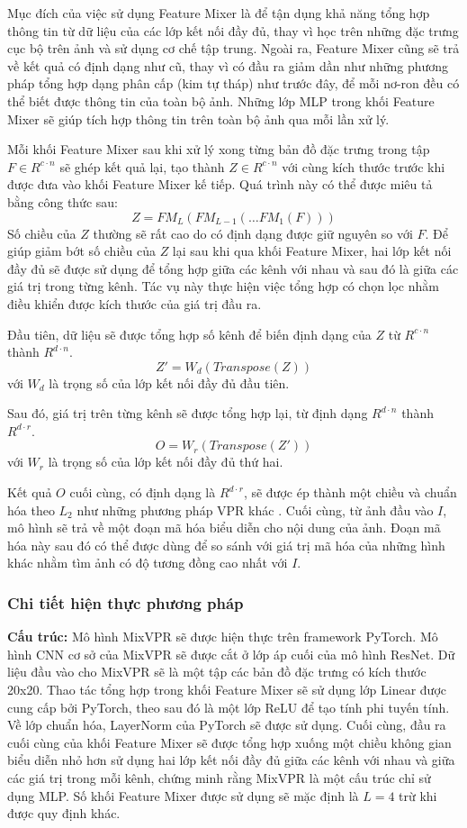 Mục đích của việc sử dụng Feature Mixer là để tận dụng khả năng tổng hợp thông tin từ dữ liệu của các lớp kết nối đầy đủ, thay vì học trên những đặc trưng cục bộ trên ảnh và sử dụng cơ chế tập trung. Ngoài ra, Feature Mixer cũng sẽ trả về kết quả có định dạng như cũ, thay vì có đầu ra giảm dần như những phương pháp tổng hợp dạng phân cấp (kim tự tháp) như trước đây, để mỗi nơ-ron đều có thể biết được thông tin của toàn bộ ảnh. Những lớp MLP trong khối Feature Mixer sẽ giúp tích hợp thông tin trên toàn bộ ảnh qua mỗi lần xử lý.

Mỗi khối Feature Mixer sau khi xử lý xong từng bản đồ đặc trưng trong tập $F \in R^{c \cdot n}$ sẽ ghép kết quả lại, tạo thành $Z \in R^{c \cdot n}$ với cùng kích thước trước khi được đưa vào khối Feature Mixer kế tiếp. Quá trình này có thể được miêu tả bằng công thức sau:
$$
Z = FM_L(FM_{L-1}(\dots FM_1(F)))
$$
Số chiều của $Z$ thường sẽ rất cao do có định dạng được giữ nguyên so với $F$. Để giúp giảm bớt số chiều của $Z$ lại sau khi qua khối Feature Mixer, hai lớp kết nối đầy đủ sẽ được sử dụng để tổng hợp giữa các kênh với nhau và sau đó là giữa các giá trị trong từng kênh. Tác vụ này thực hiện việc tổng hợp có chọn lọc nhằm điều khiển được kích thước của giá trị đầu ra.

Đầu tiên, dữ liệu sẽ được tổng hợp số kênh để biến định dạng của $Z$ từ $R^{c \cdot n}$ thành $R^{d \cdot n}$.
$$
Z' = W_d(Transpose(Z))
$$
với $W_d$ là trọng số của lớp kết nối đầy đủ đầu tiên.

Sau đó, giá trị trên từng kênh sẽ được tổng hợp lại, từ định dạng $R^{d \cdot n}$ thành $R^{d \cdot r}$.
$$
O = W_r(Transpose(Z'))
$$
với $W_r$ là trọng số của lớp kết nối đầy đủ thứ hai.

Kết quả $O$ cuối cùng, có định dạng là $R^{d \cdot r}$, sẽ được ép thành một chiều và chuẩn hóa theo $L_2$ như những phương pháp VPR khác \cite{arandjelovic2016netvlad,berton2022rethinking}. Cuối cùng, từ ảnh đầu vào $I$, mô hình sẽ trả về một đoạn mã hóa biểu diễn cho nội dung của ảnh. Đoạn mã hóa này sau đó có thể được dùng để so sánh với giá trị mã hóa của những hình khác nhằm tìm ảnh có độ tương đồng cao nhất với $I$.

\subsubsection*{Chi tiết hiện thực phương pháp}
\textbf{Cấu trúc:} Mô hình MixVPR sẽ được hiện thực trên framework PyTorch. Mô hình CNN cơ sở của MixVPR sẽ được cắt ở lớp áp cuối của mô hình ResNet. Dữ liệu đầu vào cho MixVPR sẽ là một tập các bản đồ đặc trưng có kích thước 20x20. Thao tác tổng hợp trong khối Feature Mixer sẽ sử dụng lớp Linear được cung cấp bởi PyTorch, theo sau đó là một lớp ReLU để tạo tính phi tuyến tính. Về lớp chuẩn hóa, LayerNorm của PyTorch sẽ được sử dụng. Cuối cùng, đầu ra cuối cùng của khối Feature Mixer sẽ được tổng hợp xuống một chiều không gian biểu diễn nhỏ hơn sử dụng hai lớp kết nối đầy đủ giữa các kênh với nhau và giữa các giá trị trong mỗi kênh, chứng minh rằng MixVPR là một cấu trúc chỉ sử dụng MLP. Số khối Feature Mixer được sử dụng sẽ mặc định là $L=4$ trừ khi được quy định khác.


